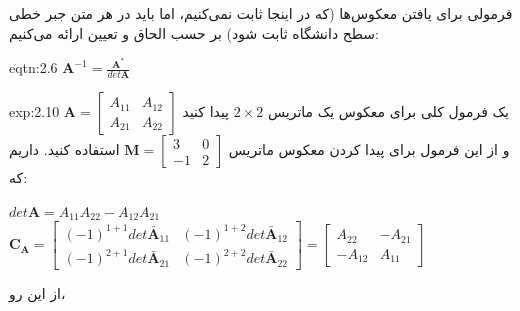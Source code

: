 {\begin{spacing}{1.5}
        فرمولی برای یافتن معکوس‌ها (که در اینجا ثابت نمی‌کنیم، اما باید در هر متن جبر خطی سطح دانشگاه ثابت شود) بر حسب الحاق و تعیین ارائه می‌کنیم:

        \begin{eqtn}{eqtn:2.6}
            \centering
            $\textbf{A}^{-1}=\frac{\displaystyle\textbf{A}^{*}}{\displaystyle det\textbf{A}}$
        \end{eqtn}

        \begin{example}{exp:2.10}
            \Large
            یک فرمول کلی برای معکوس یک ماتریس $2\times 2$ پیدا کنید $\textbf{A}=\begin{bmatrix}
                                                                                    A_{11} & A_{12} \\
                                                                                    A_{21} & A_{22}
            \end{bmatrix}$ و از این فرمول برای پیدا کردن معکوس ماتریس $\textbf{M}=\begin{bmatrix}
                                                                                      3  & 0 \\
                                                                                      -1 & 2
            \end{bmatrix}$ استفاده کنید.
            داریم که:

            \begin{center}
                $det \textbf{A}=A_{11}A_{22}-A_{12}A_{21}$ \textbf{\vspace{6pt}}
                $\textbf{C}_{\textbf{A}}=\begin{bmatrix}
                (-1)
                                             ^{1+1}det\bar{\textbf{A}}_{11}     & (-1)^{1+2}det\bar{\textbf{A}}_{12} \\
                                             (-1)^{2+1}det\bar{\textbf{A}}_{21} & (-1)^{2+2}det\bar{\textbf{A}}_{22}
                \end{bmatrix}=\begin{bmatrix}
                                  A_{22}  & -A_{21} \\
                                  -A_{12} & A_{11}
                \end{bmatrix}$
            \end{center}

            از این رو،


\end{example}
\end{spacing}}

